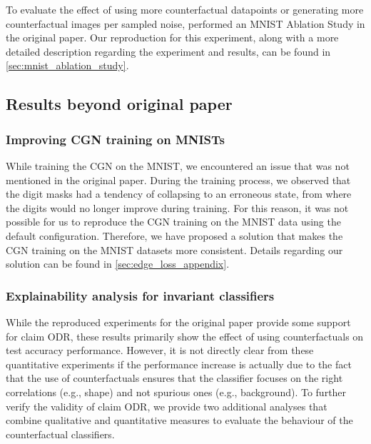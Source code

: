 To evaluate the effect of using more counterfactual datapoints or generating more counterfactual images per sampled noise, \citeauthor{Sauer2021ICLR} performed an MNIST Ablation Study in the original paper. Our reproduction for this experiment, along with a more detailed description regarding the experiment and results, can be found in \cref{sec:mnist_ablation_study}.



\subsection{Results beyond original paper} \label{ssec:extension-results}

\subsubsection{Improving CGN training on MNISTs}
\label{ssec:additional-mnist}
\label{para:training-cgn}
While training the CGN on the MNIST, we encountered an issue that was not mentioned in the original paper. During the training process, we observed that the digit masks had a tendency of collapsing to an erroneous state, from where the digits would no longer improve during training. For this reason, it was not possible for us to reproduce the CGN training on the MNIST data using the default configuration. Therefore, we have proposed a solution that makes the CGN training on the MNIST datasets more consistent. Details regarding our solution can be found in \cref{sec:edge_loss_appendix}.

\subsubsection{Explainability analysis for invariant classifiers} \label{ssec:explainability-analysis}
While the reproduced experiments for the original paper provide some support for claim ODR, these results primarily show the effect of using counterfactuals on test accuracy performance. However, it is not directly clear from these quantitative experiments if the performance increase is actually due to the fact that the use of counterfactuals ensures that the classifier focuses on the right correlations (e.g., shape) and not spurious ones (e.g., background). To further verify the validity of claim ODR, we provide two additional analyses that combine qualitative and quantitative measures to evaluate the behaviour of the counterfactual classifiers.

